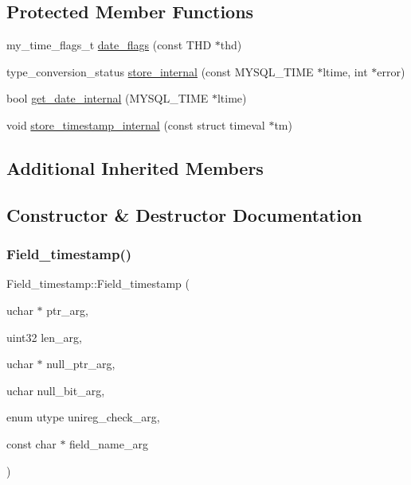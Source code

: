 \subsection*{Protected Member Functions}
\begin{DoxyCompactItemize}
\item 
my\+\_\+time\+\_\+flags\+\_\+t \mbox{\hyperlink{classField__timestamp_ac94ca4c1709650bf64c38089bfbf4aaa}{date\+\_\+flags}} (const T\+HD $\ast$thd)
\item 
type\+\_\+conversion\+\_\+status \mbox{\hyperlink{classField__timestamp_a6bc92004c2d2df2242f0c6223b078432}{store\+\_\+internal}} (const M\+Y\+S\+Q\+L\+\_\+\+T\+I\+ME $\ast$ltime, int $\ast$error)
\item 
bool \mbox{\hyperlink{classField__timestamp_aff69ed0b8fb6329aa9dd6dceb14ddd27}{get\+\_\+date\+\_\+internal}} (M\+Y\+S\+Q\+L\+\_\+\+T\+I\+ME $\ast$ltime)
\item 
void \mbox{\hyperlink{classField__timestamp_a3dfb1ebf99c1e7da4296ddb6751deb91}{store\+\_\+timestamp\+\_\+internal}} (const struct timeval $\ast$tm)
\end{DoxyCompactItemize}
\subsection*{Additional Inherited Members}


\subsection{Constructor \& Destructor Documentation}
\mbox{\label{classField__timestamp_ad53b84d4e965c99d46bc897a099d17f6}} 
\subsubsection{\texorpdfstring{Field\+\_\+timestamp()}{Field\_timestamp()}}
{\footnotesize\ttfamily Field\+\_\+timestamp\+::\+Field\+\_\+timestamp (\begin{DoxyParamCaption}\item[{uchar $\ast$}]{ptr\+\_\+arg,  }\item[{uint32}]{len\+\_\+arg,  }\item[{uchar $\ast$}]{null\+\_\+ptr\+\_\+arg,  }\item[{uchar}]{null\+\_\+bit\+\_\+arg,  }\item[{enum utype}]{unireg\+\_\+check\+\_\+arg,  }\item[{const char $\ast$}]{field\+\_\+name\+\_\+arg }\end{DoxyParamCaption})}

